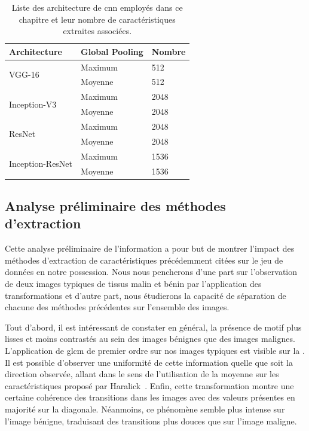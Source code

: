 \begin{table}[H]
    \centering
    \begin{tabular}{lll}
    \toprule
    \textbf{Architecture}               & Global Pooling   & \textbf{Nombre}    \\ \hline
    \multirow{2}{*}{VGG-16}             & Maximum          & 512                \\ \cline{2-3}
                                        & Moyenne          & 512                \\ \hline
    \multirow{2}{*}{Inception-V3}       & Maximum          & 2048               \\ \cline{2-3}
                                        & Moyenne          & 2048               \\ \hline
    \multirow{2}{*}{ResNet}             & Maximum          & 2048               \\ \cline{2-3}
                                        & Moyenne          & 2048               \\ \hline
    \multirow{2}{*}{Inception-ResNet}   & Maximum          & 1536               \\ \cline{2-3}
                                        & Moyenne          & 1536               \\
    \bottomrule
    \end{tabular}
    \caption{Liste des architecture de \gls{cnn} employés dans ce chapitre et leur nombre de caractéristiques extraites associées.}
    \label{tab:number_features_transferlearning}
\end{table}\par

\subsection{Analyse préliminaire des méthodes d'extraction}
Cette analyse préliminaire de l'information a pour but de montrer l'impact des méthodes d'extraction de caractéristiques précédemment citées sur le jeu de données en notre possession. Nous nous pencherons d'une part sur l'observation de deux images typiques de tissus malin et bénin par l'application des transformations et d'autre part, nous étudierons la capacité de séparation de chacune des méthodes précédentes sur l'ensemble des images.\par

Tout d'abord, il est intéressant de constater en général, la présence de motif plus lisses et moins contrastés au sein des images bénignes que des images malignes. L'application de \gls{glcm} de premier ordre sur nos images typiques est visible sur la . Il est possible d'observer une uniformité de cette information quelle que soit la direction observée, allant dans le sens de l'utilisation de la moyenne sur les caractéristiques proposé par Haralick~\cite{Wiltgen2008}. Enfin, cette transformation montre une certaine cohérence des transitions dans les images avec des valeurs présentes en majorité sur la diagonale. Néanmoins, ce phénomène semble plus intense sur l'image bénigne, traduisant des transitions plus douces que sur l'image maligne.\par

